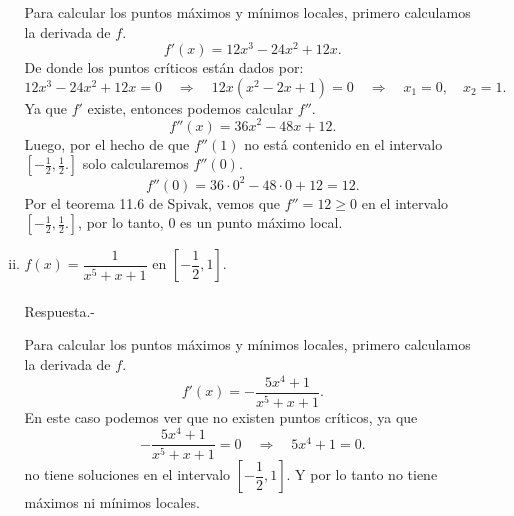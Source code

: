 \begin{enumerate}[\bfseries 1.]
\begin{enumerate}[(i)]
		Para calcular los puntos máximos y mínimos locales, primero calculamos la derivada de $f$.
		$$f'(x)=12x^3-24x^2+12x.$$
		De donde los puntos críticos están dados por:
		$$12x^3-24x^2+12x=0 \quad \Rightarrow \quad 12x(x^2-2x+1)=0 \quad \Rightarrow \quad x_1=0, \quad x_2=1.$$
		Ya que $f'$ existe, entonces podemos calcular $f''$.
		$$f''(x)=36x^2-48x+12.$$
		Luego, por el hecho de que $f''(1)$ no está contenido en el intervalo $\left[-\frac{1}{2},\frac{1}{2}.\right]$ solo calcularemos $f''\left(0\right)$.
		$$f''\left(0\right)=36\cdot 0^2 - 48\cdot 0 + 12 = 12.$$
		Por el teorema 11.6 de Spivak, vemos que $f''=12\geq 0$ en el intervalo $\left[-\frac{1}{2},\frac{1}{2}.\right]$, por lo tanto, $0$ es un punto máximo local.\\

	    \item $f(x)=\dfrac{1}{x^5+x+1}$ en $\left[-\dfrac{1}{2},1\right]$.\\\\
		Respuesta.-\; 
		\begin{center}
		\end{center}
		Para calcular los puntos máximos y mínimos locales, primero calculamos la derivada de $f$.
		$$f'(x)=-\dfrac{5x^4+1}{x^5+x+1}.$$
		En este caso podemos ver que no existen puntos críticos, ya que
		$$-\dfrac{5x^4+1}{x^5+x+1}=0 \quad \Rightarrow \quad 5x^4+1=0.$$
		no tiene soluciones en el intervalo $\left[-\dfrac{1}{2},1\right]$. Y por lo tanto no tiene máximos ni mínimos locales.\\\\


\end{enumerate}
\end{enumerate}

